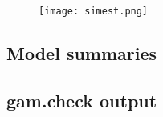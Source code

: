 \documentclass[11pt,letterpaper]{article}
\begin{document}
\begin{figure}[!htb]
\centering
\texttt{[image: simest.png]}
\caption{}
\end{figure}

\clearpage
\subsection{Model summaries}
\begin{scriptsize}

\end{scriptsize}
\clearpage
\subsection{gam.check output}
\begin{scriptsize}

\end{scriptsize}
\clearpage


\end{document}
